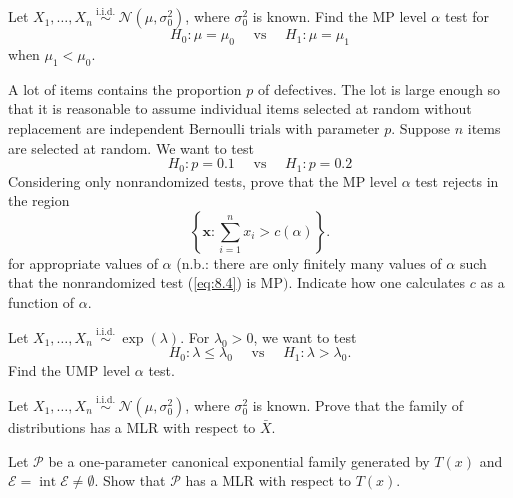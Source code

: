 \begin{ex}
    Let \(X_{1}, \ldots, X_{n} \stackrel{\text { i.i.d. }}{\sim} \mathcal{N}\left(\mu, \sigma_{0}^{2}\right)\), where \(\sigma_{0}^{2}\) is known. Find the MP level \(\alpha\) test for
    \[
        H_{0}: \mu=\mu_{0} \quad \text { vs } \quad H_{1}: \mu=\mu_{1}
    \]
    when \(\mu_{1}<\mu_{0}\). 
\end{ex}

\begin{ex}
    A lot of items contains the proportion \(p\) of defectives. The lot is large enough so that it is reasonable to assume individual items selected at random without replacement are independent Bernoulli trials with parameter \(p\). Suppose \(n\) items are selected at random. We want to test
    \[
        H_{0}: p=0.1 \quad \text { vs } \quad H_{1}: p=0.2
    \]
    Considering only nonrandomized tests, prove that the MP level \(\alpha\) test rejects in the region
    \begin{equation}
        \label{eq:8.4}
        \left\{\mathbf{x}: \sum_{i=1}^{n} x_{i}>c(\alpha)\right\}. 
    \end{equation}
    for appropriate values of \(\alpha\) (n.b.: there are only finitely many values of \(\alpha\) such that the nonrandomized test (\ref{eq:8.4}) is \(\mathrm{MP})\). Indicate how one calculates \(c\) as a function of \(\alpha\). 
\end{ex}

\begin{ex}
    Let \(X_{1}, \ldots, X_{n} \stackrel{\text { i.i.d. }}{\sim} \exp (\lambda)\). For \(\lambda_{0}>0\), we want to test
    \[
        H_{0}: \lambda \leq \lambda_{0} \quad \text { vs } \quad H_{1}: \lambda>\lambda_{0} .
    \]
    Find the UMP level \(\alpha\) test. 
\end{ex}


\begin{ex}
    Let \(X_{1}, \ldots, X_{n} \stackrel{\text { i.i.d. }}{\sim} \mathcal{N}\left(\mu, \sigma_{0}^{2}\right)\), where \(\sigma_{0}^{2}\) is known. Prove that the family of distributions has a MLR with respect to \(\bar{X}\). 
\end{ex}

\begin{ex}
    Let \(\mathcal{P}\) be a one-parameter canonical exponential family generated by \(T(x)\) and \(\mathcal{E}=\operatorname{int} \mathcal{E} \neq \emptyset\). Show that \(\mathcal{P}\) has a MLR with respect to \(T(x)\). 
\end{ex}

